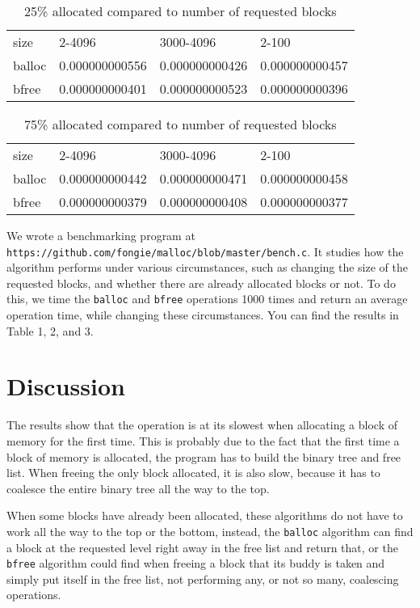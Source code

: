 \documentclass{article}
\def\code#1{\texttt{#1}}
\begin{document}
\begin{table}[]
\caption{25\% allocated compared to number of requested blocks}
\begin{tabular}{llll}
size         & 2-4096     & 3000-4096   & 2-100         \\
balloc       & 0.000000000556 & 0.000000000426 & 0.000000000457  \\
bfree        & 0.000000000401 & 0.000000000523 & 0.000000000396  \\
\end{tabular}
\end{table}

\begin{table}[]
\caption{75\% allocated compared to number of requested blocks}
\begin{tabular}{llll}
size         & 2-4096     & 3000-4096   & 2-100         \\
balloc       & 0.000000000442 & 0.000000000471 & 0.000000000458 \\
bfree        & 0.000000000379 & 0.000000000408 & 0.000000000377 \\
\end{tabular}
\end{table}

We wrote a benchmarking program at \code{https://github.com/fongie/malloc/blob/master/bench.c}. It studies how the algorithm performs under various circumstances, such as changing the size of the requested blocks, and whether there are already allocated blocks or not. To do this, we time the \code{balloc} and \code{bfree} operations 1000 times and return an average operation time, while changing these circumstances. You can find the results in Table 1, 2, and 3.

\section{Discussion}

The results show that the operation is at its slowest when allocating a block of memory for the first time. This is probably due to the fact that the first time a block of memory is allocated, the program has to build the binary tree and free list. When freeing the only block allocated, it is also slow, because it has to coalesce the entire binary tree all the way to the top.

When some blocks have already been allocated, these algorithms do not have to work all the way to the top or the bottom, instead, the \code{balloc} algorithm can find a block at the requested level right away in the free list and return that, or the \code{bfree} algorithm could find when freeing a block that its buddy is taken and simply put itself in the free list, not performing any, or not so many, coalescing operations.
\end{document}
